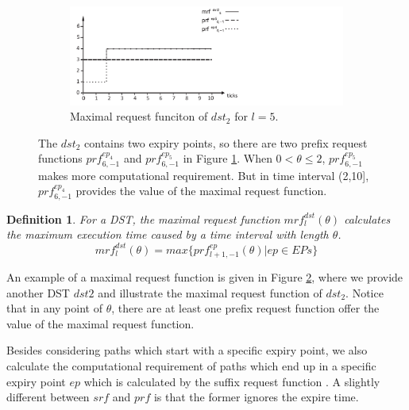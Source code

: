 \documentclass[10pt,conference]{IEEEtran}
\newtheorem{definition}{Definition}
\begin{document}
\begin{figure}
\begin{subfigure}[t]{3.25in}
    \centering
    \includegraphics[scale=.54]{graphics/figure_mrf-eps-converted-to.pdf}
    \caption{Maximal request funciton of $dst_2$ for $l=5$.}\label{figure_mrf}
  \end{subfigure}
  \caption{The $dst_2$ contains two expiry points, so there are two prefix request functions $prf^{ep_4}_{6,-1}$ and $prf^{ep_5}_{6,-1}$ in Figure \ref{figure_mrf}. When $0<\theta\leq2$, $prf^{ep_5}_{6,-1}$ makes more computational requirement. But in time interval (2,10], $prf^{ep_4}_{6,-1}$ provides the value of the maximal request function.}\label{figure_dst2_mrf}
\end{figure}
\begin{definition}
For a DST, the maximal request function $mrf^{dst}_l(\theta)$ calculates the maximum execution time caused by a time interval with length $\theta$.%
\begin{equation}
mrf^{dst}_l(\theta)=max\{prf^{ep}_{l+1,-1}(\theta)|ep\in EPs\}
\end{equation}\label{equation_mrf}
\end{definition}

An example of a maximal request function is given in Figure \ref{figure_dst2_mrf}, where we provide another DST $dst2$ and illustrate the maximal request function of $dst_2$. Notice that in any point of $\theta$, there are at least one prefix request function offer the value of the maximal request function.

Besides considering paths which start with a specific expiry point, we also calculate the computational requirement of paths which end up in a specific expiry point $ep$ which is calculated by the suffix request function \cite{DBLP:journals/rts/Stigge015a}. A slightly different between $srf$ and $prf$ is that the former ignores the expire time.%
\end{document}
